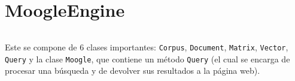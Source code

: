 \section{MoogleEngine}
\begin{frame}
    \begin{columns}[t]
        \begin{column}{.5\textwidth}
          \tableofcontents[sections={1-2},currentsection]
        \end{column}
        \begin{column}{.5\textwidth}
          \tableofcontents[sections={3-4},currentsection]
        \end{column}
    \end{columns}
\end{frame}

\begin{frame}[fragile]
Este se compone de 6 clases importantes: \texttt{Corpus}, \texttt{Document}, \texttt{Matrix},
\texttt{Vector}, \texttt{Query} y la clase \texttt{Moogle}, que contiene un método \texttt{Query}
(el cual se encarga de procesar una búsqueda y de devolver sus resultados a la página web).
\end{frame}

